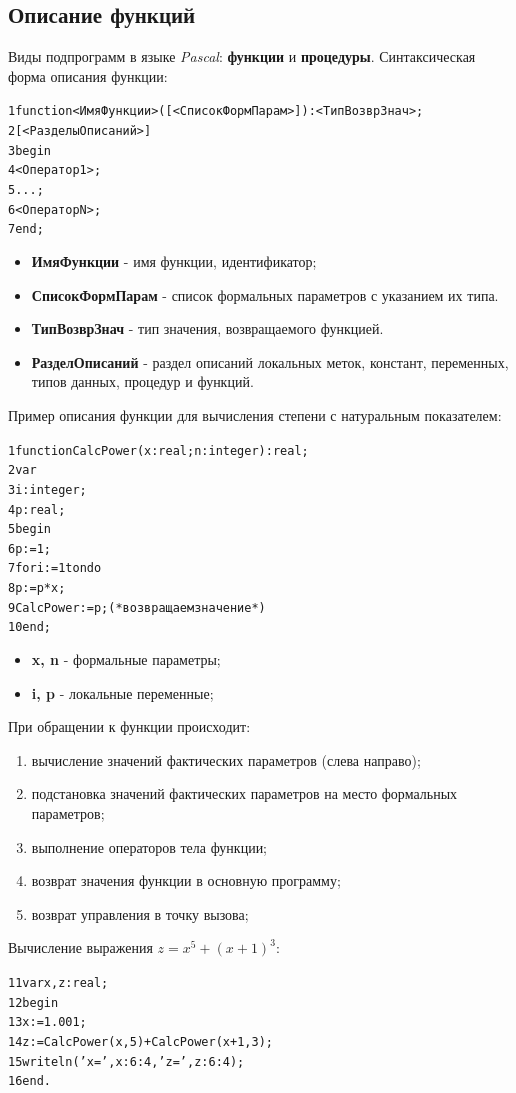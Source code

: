 \documentclass{beamer}
\begin{document}
\subsection{Описание функций}
\begin{frame}[fragile]
Виды подпрограмм в языке \textit{Pascal}: \textbf{функции} и \textbf{процедуры}. Синтаксическая форма описания функции:
\begin{alltt}
1 function <ИмяФункции>([<СписокФормПарам>]):<ТипВозврЗнач>;
2 [<РазделыОписаний>]
3 begin
4   <Оператор 1>;
5   ...;
6   <Оператор N>;
7 end;
\end{alltt}
\begin{itemize}
\item \textbf{ИмяФункции} - имя функции, идентификатор;
\item \textbf{СписокФормПарам} - список формальных параметров с указанием их типа.
\item \textbf{ТипВозврЗнач} - тип значения, возвращаемого функцией.
\item \textbf{РазделОписаний} - раздел описаний локальных меток, констант, переменных, типов данных, процедур и функций.
\end{itemize}
\end{frame}

\begin{frame}[fragile]
Пример описания функции для вычисления степени с натуральным показателем:
\begin{alltt}
1 function CalcPower(x: real; n: integer):real;
2 var 
3   i: integer;
4   p: real;
5 begin
6   p := 1;
7   for i := 1 to n do 
8       p := p * x;
9   CalcPower := p; (*возвращаем значение*)
10 end;
\end{alltt}
\begin{itemize}
\item \textbf{x, n} - формальные параметры;
\item \textbf{i, p} - локальные переменные;
\end{itemize}
\end{frame}

\begin{frame}[fragile]
При обращении к функции происходит:
\begin{enumerate}
\item вычисление значений фактических параметров (слева направо);
\item подстановка значений фактических параметров на место формальных параметров;
\item выполнение операторов тела функции;
\item возврат значения функции в основную программу;
\item возврат управления в точку вызова;
\end{enumerate}
Вычисление выражения $z = x^{5} + (x+1)^{3}$:
\begin{alltt}
11 var x, z: real; 
12 begin
13   x := 1.001;
14   z := CalcPower(x, 5) + CalcPower(x+1, 3);
15   writeln('x=', x:6:4, 'z=', z:6:4);
16 end.
\end{alltt}
\end{frame}
\end{document}
